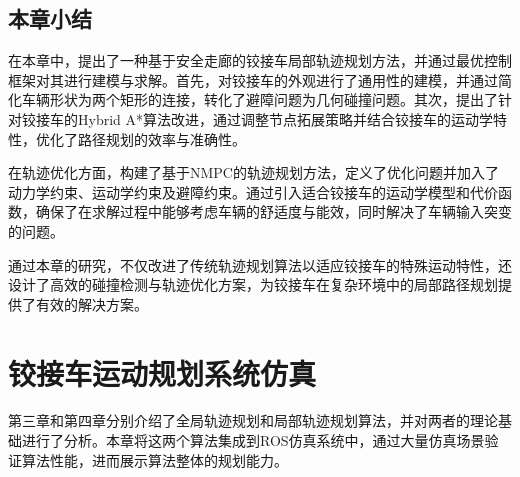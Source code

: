 \documentclass[master,academic]{ysuthesis} %
\begin{document}
	\section{本章小结}
	在本章中，提出了一种基于安全走廊的铰接车局部轨迹规划方法，并通过最优控制框架对其进行建模与求解。首先，对铰接车的外观进行了通用性的建模，并通过简化车辆形状为两个矩形的连接，转化了避障问题为几何碰撞问题。其次，提出了针对铰接车的Hybrid A*算法改进，通过调整节点拓展策略并结合铰接车的运动学特性，优化了路径规划的效率与准确性。

	在轨迹优化方面，构建了基于NMPC的轨迹规划方法，定义了优化问题并加入了动力学约束、运动学约束及避障约束。通过引入适合铰接车的运动学模型和代价函数，确保了在求解过程中能够考虑车辆的舒适度与能效，同时解决了车辆输入突变的问题。

	通过本章的研究，不仅改进了传统轨迹规划算法以适应铰接车的特殊运动特性，还设计了高效的碰撞检测与轨迹优化方案，为铰接车在复杂环境中的局部路径规划提供了有效的解决方案。
	
	\chapter{铰接车运动规划系统仿真}
	第三章和第四章分别介绍了全局轨迹规划和局部轨迹规划算法，并对两者的理论基础进行了分析。本章将这两个算法集成到ROS仿真系统中，通过大量仿真场景验证算法性能，进而展示算法整体的规划能力。
	
\end{document}
